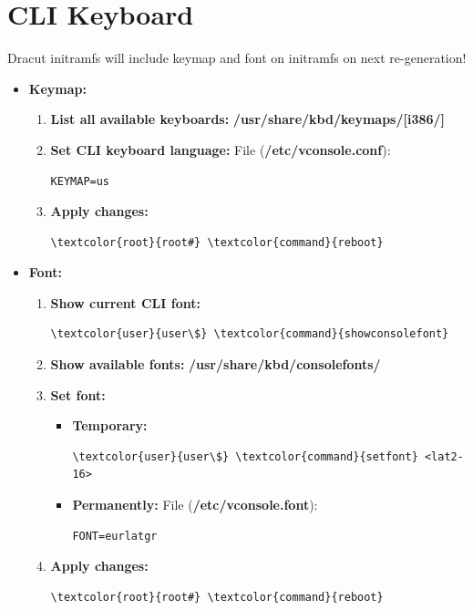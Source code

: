 \documentclass[10pt, a4paper, onecolumn, oneside, titlepage, openany]{book}
\begin{document}
\section{CLI Keyboard}
Dracut initramfs will include keymap and font on initramfs on next re-generation!
\begin{itemize}
    \item \textbf{Keymap:}
    \begin{enumerate}
        \item \textbf{List all available keyboards:}
\newline \textbf{\textcolor{dir}{/usr/share/kbd/keymaps/[i386/]}}
        \item \textbf{Set CLI keyboard language:}
\newline File (\textbf{\textcolor{file}{/etc/vconsole.conf}}):
\begin{Verbatim}[commandchars=\\\{\}]
KEYMAP=us
\end{Verbatim}
    \item \textbf{Apply changes:}
\begin{Verbatim}[commandchars=\\\{\}]
\textcolor{root}{root#} \textcolor{command}{reboot}
\end{Verbatim}
    \end{enumerate}
    \item \textbf{Font:}
    \begin{enumerate}
        \item \textbf{Show current CLI font:}
\begin{Verbatim}[commandchars=\\\{\}]
\textcolor{user}{user\$} \textcolor{command}{showconsolefont}
\end{Verbatim}
        \item \textbf{Show available fonts:}
\newline \textbf{\textcolor{dir}{/usr/share/kbd/consolefonts/}}
        \item \textbf{Set font:}
        \begin{itemize}
            \item \textbf{Temporary:}
\begin{Verbatim}[commandchars=\\\{\}]
\textcolor{user}{user\$} \textcolor{command}{setfont} <lat2-16>
\end{Verbatim}
            \item \textbf{Permanently:}
\newline File (\textbf{\textcolor{file}{/etc/vconsole.font}}):
\begin{Verbatim}[commandchars=\\\{\}]
FONT=eurlatgr
\end{Verbatim}
        \end{itemize}
        \item \textbf{Apply changes:}
\begin{Verbatim}[commandchars=\\\{\}]
\textcolor{root}{root#} \textcolor{command}{reboot}
\end{Verbatim}
    \end{enumerate}
\end{itemize}
\end{document}
